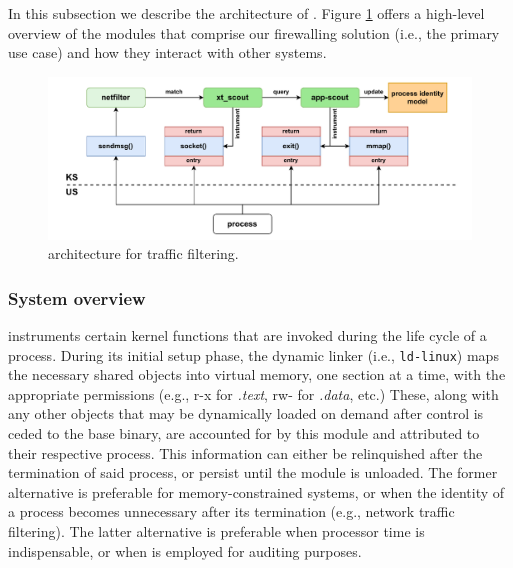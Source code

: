 In this subsection we describe the architecture of \scout{}. Figure
\ref{appfw:appscout:fig:sys-architecture} offers a high-level overview of the
modules that comprise our firewalling solution (i.e., the primary use case) and
how they interact with other systems.

\begin{figure}
    \centering
    \includegraphics[width=\textwidth,keepaspectratio]{figures/appscout-architecture.pdf}
    \caption{\scout{} architecture for traffic filtering.}
    \label{appfw:appscout:fig:sys-architecture}
\end{figure}


\subsubsection{System overview}

\scout{} instruments certain kernel functions that are invoked during the life
cycle of a process. During its initial setup phase, the dynamic linker (i.e.,
\texttt{ld-linux}) maps the necessary shared objects into virtual memory, one
section at a time, with the appropriate permissions (e.g., r-x for
\textit{.text}, rw- for \textit{.data}, etc.) These, along with any other
objects that may be dynamically loaded on demand after control is ceded to the
base binary, are accounted for by this module and attributed to their respective
process. This information can either be relinquished after the termination of
said process, or persist until the module is unloaded. The former alternative is
preferable for memory-constrained systems, or when the identity of a process
becomes unnecessary after its termination (e.g., network traffic filtering).
The latter alternative is preferable when processor time is indispensable, or
when \scout{} is employed for auditing purposes.

